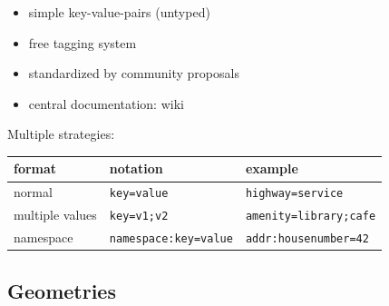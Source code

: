 \documentclass{beamer}
\begin{document}
			\begin{frame}
				\begin{itemize}
					\item simple key-value-pairs (untyped)
					\item free tagging system
					\item standardized by community proposals
					\item central documentation: wiki
				\end{itemize}
				\vspace{0.25cm}
				Multiple strategies:\\
				\vspace{0.25cm}
				\begin{tabular}{|l|l|l|}
					\hline
					\textbf{format} & \textbf{notation} & \textbf{example} \\
					\hline
					normal & \texttt{key=value} & \texttt{highway=service} \\ 
					\hline 
					multiple values & \texttt{key=v1;v2} & \texttt{amenity=library;cafe} \\ 
					\hline 
					namespace & \texttt{namespace:key=value} & \texttt{addr:housenumber=42} \\ 
					\hline 
				\end{tabular}
			\end{frame}
		
		\subsection{Geometries}
		
\end{document}
